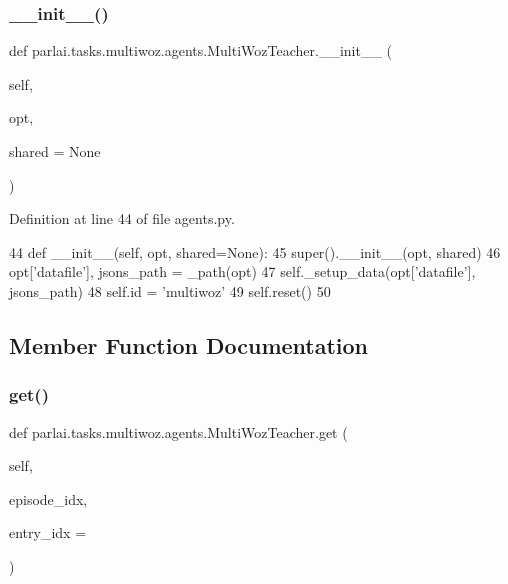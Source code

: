 \subsubsection{\texorpdfstring{\+\_\+\+\_\+init\+\_\+\+\_\+()}{\_\_init\_\_()}}
{\footnotesize\ttfamily def parlai.\+tasks.\+multiwoz.\+agents.\+Multi\+Woz\+Teacher.\+\_\+\+\_\+init\+\_\+\+\_\+ (\begin{DoxyParamCaption}\item[{}]{self,  }\item[{}]{opt,  }\item[{}]{shared = {\ttfamily None} }\end{DoxyParamCaption})}



Definition at line 44 of file agents.\+py.


\begin{DoxyCode}
44     \textcolor{keyword}{def }\_\_init\_\_(self, opt, shared=None):
45         super().\_\_init\_\_(opt, shared)
46         opt[\textcolor{stringliteral}{'datafile'}], jsons\_path = \_path(opt)
47         self.\_setup\_data(opt[\textcolor{stringliteral}{'datafile'}], jsons\_path)
48         self.id = \textcolor{stringliteral}{'multiwoz'}
49         self.reset()
50 
\end{DoxyCode}


\subsection{Member Function Documentation}
\mbox{\label{classparlai_1_1tasks_1_1multiwoz_1_1agents_1_1MultiWozTeacher_acca718e7c3409e583f161f45956fe486}} 
\subsubsection{\texorpdfstring{get()}{get()}}
{\footnotesize\ttfamily def parlai.\+tasks.\+multiwoz.\+agents.\+Multi\+Woz\+Teacher.\+get (\begin{DoxyParamCaption}\item[{}]{self,  }\item[{}]{episode\+\_\+idx,  }\item[{}]{entry\+\_\+idx = {} }\end{DoxyParamCaption})}



